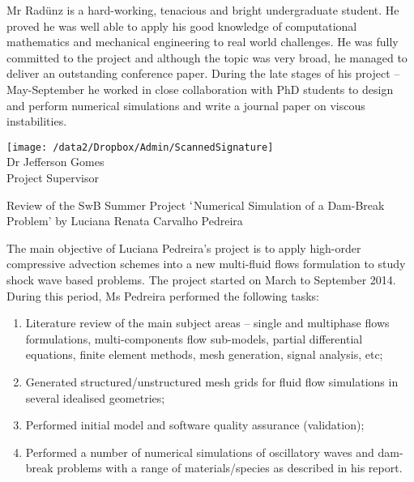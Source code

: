\documentclass[14pt,twoside]{report}
\begin{document}
Mr Rad\"unz is a hard-working, tenacious and bright undergraduate student. He proved he was well able to apply his good knowledge of computational mathematics and mechanical engineering to real world challenges. He was fully committed to the project and although the topic was very broad, he managed to deliver an outstanding conference paper. During the late stages of his project -- May-September he worked in close collaboration with PhD students to design and perform numerical simulations and write a journal paper on viscous instabilities. 
\begin{center}
\texttt{[image: /data2/Dropbox/Admin/ScannedSignature]}\\
{Dr Jefferson Gomes}\\
{Project Supervisor}\\
\end{center}



\clearpage



\medskip

\begin{center}
{\Large Review of the SwB Summer Project $\lq$Numerical Simulation of a Dam-Break Problem' by Luciana Renata Carvalho Pedreira}
\end{center}

The main objective of Luciana Pedreira's project is to apply high-order compressive advection schemes into a new multi-fluid flows formulation to study shock wave based problems. The project started on March to September 2014. During this period, Ms Pedreira performed the following tasks:
\begin{enumerate}
\item Literature review of the main subject areas -- single and multiphase flows formulations, multi-components flow sub-models, partial differential equations, finite element methods, mesh generation, signal analysis, etc;
\item Generated structured/unstructured mesh grids for fluid flow simulations in several idealised geometries;
\item Performed initial model and software quality assurance (validation);
\item Performed a number of numerical simulations of oscillatory waves and dam-break problems with a range of materials/species as described in his report. 
\end{enumerate} 
\end{document}
